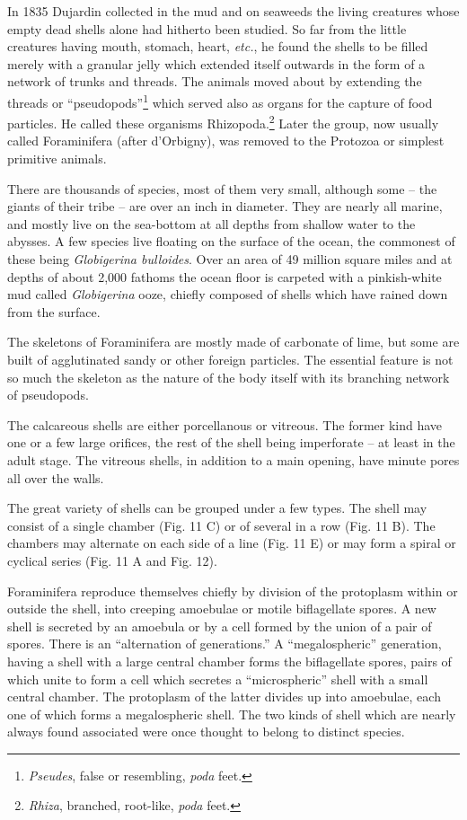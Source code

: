 \documentclass[a4paper, 12pt, oneside]{article}
\begin{document}
In 1835 Dujardin collected in the mud and on seaweeds the living creatures whose empty dead shells alone had hitherto been studied. So far from the little creatures having mouth, stomach, heart, \emph{etc.}, he found the shells to be filled merely with a granular jelly which extended itself outwards in the form of a network of trunks and threads. The animals moved about by extending the threads or ``pseudopods''\footnote{\emph{Pseudes}, false or resembling, \emph{poda} feet.} which served also as organs for the capture of food particles. He called these organisms Rhizopoda.\footnote{\emph{Rhiza}, branched, root-like, \emph{poda} feet.} Later the group, now usually called Foraminifera (after d'Orbigny), was removed to the Protozoa or simplest primitive animals.

There are thousands of species, most of them very small, although some -- the giants of their tribe -- are over an inch in diameter. They are nearly all marine, and mostly live on the sea-bottom at all depths from shallow water to the abysses. A few species live floating on the surface of the ocean, the commonest of these being \emph{Globigerina bulloides}. Over an area of 49 million square miles and at depths of about 2,000 fathoms the ocean floor is carpeted with a pinkish-white mud called \emph{Globigerina} ooze, chiefly composed of shells which have rained down from the surface.

The skeletons of Foraminifera are mostly made of carbonate of lime, but some are built of agglutinated sandy or other foreign particles. The essential feature is not so much the skeleton as the nature of the body itself with its branching network of pseudopods.

The calcareous shells are either porcellanous or vitreous. The former kind have one or a few large orifices, the rest of the shell being imperforate -- at least in the adult stage. The vitreous shells, in addition to a main opening, have minute pores all over the walls.

The great variety of shells can be grouped under a few types. The shell may consist of a single chamber (Fig. 11 C) or of several in a row (Fig. 11 B). The chambers may alternate on each side of a line (Fig. 11 E) or may form a spiral or cyclical series (Fig. 11 A and Fig. 12).

Foraminifera reproduce themselves chiefly by division of the protoplasm within or outside the shell, into creeping amoebulae or motile biflagellate spores. A new shell is secreted by an amoebula or by a cell formed by the union of a pair of spores. There is an ``alternation of generations.'' A ``megalospheric'' generation, having a shell with a large central chamber forms the biflagellate spores, pairs of which unite to form a cell which secretes a ``microspheric'' shell with a small central chamber. The protoplasm of the latter divides up into amoebulae, each one of which forms a megalospheric shell. The two kinds of shell which are nearly always found associated were once thought to belong to distinct species.
\end{document}
